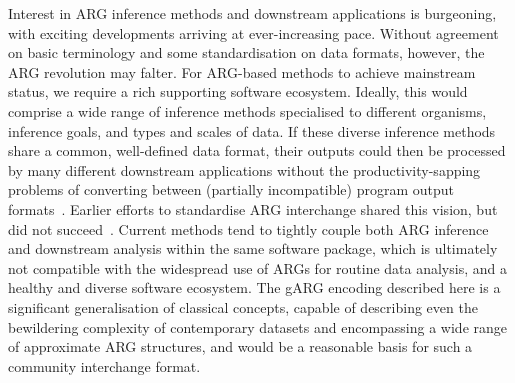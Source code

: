 \documentclass{article}
\begin{document}
Interest in ARG inference methods and downstream applications is
burgeoning, with exciting developments arriving at ever-increasing pace.
Without agreement on basic terminology and some standardisation
on data formats, however, the ARG revolution may falter.
For ARG-based methods to achieve mainstream status, we require
a rich supporting software ecosystem.
Ideally, this would comprise a wide range of
inference methods specialised to different organisms,
inference goals, and types and scales of data.
If these diverse inference methods share a common,
well-defined data format, their outputs could then be
processed by many different downstream applications
without the productivity-sapping problems
of converting between (partially incompatible)
program output formats~\citep{excoffier2006computer}.
Earlier efforts to standardise ARG interchange shared this vision,
but did not succeed~\citep{cardona2008extended,mcgill2013graphml}.
Current methods tend to tightly couple both ARG inference and downstream
analysis within the same software package,
which is ultimately not compatible with the widespread use
of ARGs for routine data analysis, and a healthy and diverse software ecosystem.
The gARG encoding described here is a significant generalisation
of classical concepts, capable of describing even the bewildering complexity
of contemporary datasets and encompassing a wide range of approximate
ARG structures, and would be a reasonable basis for such a community
interchange format.
\end{document}
